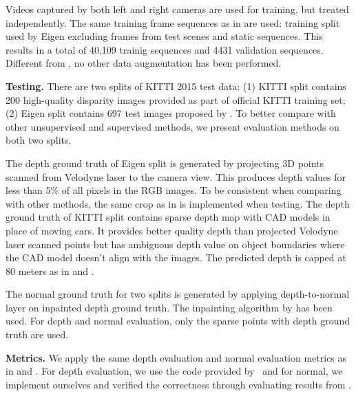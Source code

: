 Videos captured by both left and right cameras are used for training, but treated independently. The same training frame sequences as in \cite{zhou2017unsupervised} are used: training split used by Eigen \etal  \cite{eigen2014depth} excluding frames from test scenes and static sequences. This results in a total of 40,109 trainig sequences and 4431 validation sequences. Different from \cite{godard2016unsupervised}, no other data augmentation has been performed.

\textbf{Testing.} 
There are two splits of KITTI 2015 test data: (1) KITTI split contains 200 high-quality disparity images provided as part of official KITTI training set; (2) Eigen split contains 697 test images proposed by \cite{eigen2014depth}. To better compare with other unsupervised and supervised methods, we present evaluation methods on both two splits. 

The depth ground truth of Eigen split is generated by projecting 3D points scanned from Velodyne laser to the camera view. This produces depth values for less than 5\% of all pixels in the RGB images. To be consistent when comparing with other methods, the same crop as in \cite{eigen2014depth} is implemented when testing. The depth ground truth of KITTI split contains sparse depth map with CAD models in place of moving cars. It provides better quality depth than projected Velodyne laser scanned points but has ambiguous depth value on object boundaries where the CAD model doesn't align with the images. The predicted depth is capped at 80 meters as in \cite{godard2016unsupervised} and \cite{zhou2017unsupervised}.

The normal ground truth for two splits is generated by applying depth-to-normal layer on inpainted depth ground truth. The inpainting algorithm by \cite{silberman2012indoor} has been used. For depth and normal evaluation, only the sparse points with depth ground truth are used.

\textbf{Metrics.} We apply the same depth evaluation and normal evaluation metrics as in \cite{eigen2014depth} and \cite{eigen2015predicting}. For depth evaluation, we use the code provided by~\cite{zhou2017unsupervised} and for normal, we implement ourselves and verified the correctness through evaluating results from \cite{eigen2015predicting}.



